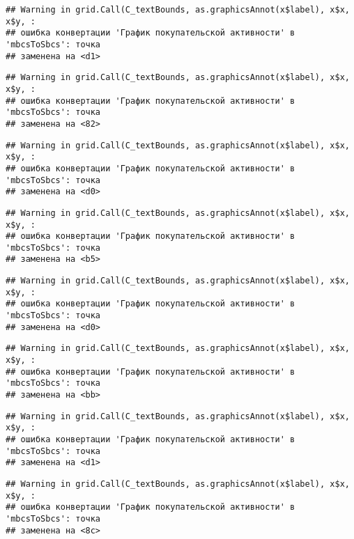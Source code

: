 \documentclass[
]{article}
\begin{document}
\begin{verbatim}
## Warning in grid.Call(C_textBounds, as.graphicsAnnot(x$label), x$x, x$y, :
## ошибка конвертации 'График покупательской активности' в 'mbcsToSbcs': точка
## заменена на <d1>
\end{verbatim}

\begin{verbatim}
## Warning in grid.Call(C_textBounds, as.graphicsAnnot(x$label), x$x, x$y, :
## ошибка конвертации 'График покупательской активности' в 'mbcsToSbcs': точка
## заменена на <82>
\end{verbatim}

\begin{verbatim}
## Warning in grid.Call(C_textBounds, as.graphicsAnnot(x$label), x$x, x$y, :
## ошибка конвертации 'График покупательской активности' в 'mbcsToSbcs': точка
## заменена на <d0>
\end{verbatim}

\begin{verbatim}
## Warning in grid.Call(C_textBounds, as.graphicsAnnot(x$label), x$x, x$y, :
## ошибка конвертации 'График покупательской активности' в 'mbcsToSbcs': точка
## заменена на <b5>
\end{verbatim}

\begin{verbatim}
## Warning in grid.Call(C_textBounds, as.graphicsAnnot(x$label), x$x, x$y, :
## ошибка конвертации 'График покупательской активности' в 'mbcsToSbcs': точка
## заменена на <d0>
\end{verbatim}

\begin{verbatim}
## Warning in grid.Call(C_textBounds, as.graphicsAnnot(x$label), x$x, x$y, :
## ошибка конвертации 'График покупательской активности' в 'mbcsToSbcs': точка
## заменена на <bb>
\end{verbatim}

\begin{verbatim}
## Warning in grid.Call(C_textBounds, as.graphicsAnnot(x$label), x$x, x$y, :
## ошибка конвертации 'График покупательской активности' в 'mbcsToSbcs': точка
## заменена на <d1>
\end{verbatim}

\begin{verbatim}
## Warning in grid.Call(C_textBounds, as.graphicsAnnot(x$label), x$x, x$y, :
## ошибка конвертации 'График покупательской активности' в 'mbcsToSbcs': точка
## заменена на <8c>
\end{verbatim}
\end{document}
